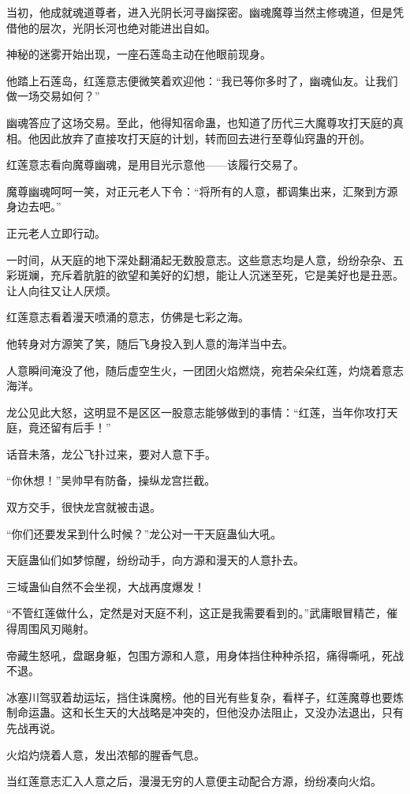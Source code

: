 \begin{this_body}
当初，他成就魂道尊者，进入光阴长河寻幽探密。幽魂魔尊当然主修魂道，但是凭借他的层次，光阴长河也绝对能进出自如。

神秘的迷雾开始出现，一座石莲岛主动在他眼前现身。

他踏上石莲岛，红莲意志便微笑着欢迎他：“我已等你多时了，幽魂仙友。让我们做一场交易如何？”

幽魂答应了这场交易。至此，他得知宿命蛊，也知道了历代三大魔尊攻打天庭的真相。他因此放弃了直接攻打天庭的计划，转而回去进行至尊仙窍蛊的开创。

红莲意志看向魔尊幽魂，是用目光示意他——该履行交易了。

魔尊幽魂呵呵一笑，对正元老人下令：“将所有的人意，都调集出来，汇聚到方源身边去吧。”

正元老人立即行动。

一时间，从天庭的地下深处翻涌起无数股意志。这些意志均是人意，纷纷杂杂、五彩斑斓，充斥着肮脏的欲望和美好的幻想，能让人沉迷至死，它是美好也是丑恶。让人向往又让人厌烦。

红莲意志看着漫天喷涌的意志，仿佛是七彩之海。

他转身对方源笑了笑，随后飞身投入到人意的海洋当中去。

人意瞬间淹没了他，随后虚空生火，一团团火焰燃烧，宛若朵朵红莲，灼烧着意志海洋。

龙公见此大怒，这明显不是区区一股意志能够做到的事情：“红莲，当年你攻打天庭，竟还留有后手！”

话音未落，龙公飞扑过来，要对人意下手。

“你休想！”吴帅早有防备，操纵龙宫拦截。

双方交手，很快龙宫就被击退。

“你们还要发呆到什么时候？”龙公对一干天庭蛊仙大吼。

天庭蛊仙们如梦惊醒，纷纷动手，向方源和漫天的人意扑去。

三域蛊仙自然不会坐视，大战再度爆发！

“不管红莲做什么，定然是对天庭不利，这正是我需要看到的。”武庸眼冒精芒，催得周围风刃飚射。

帝藏生怒吼，盘踞身躯，包围方源和人意，用身体挡住种种杀招，痛得嘶吼，死战不退。

冰塞川驾驭着劫运坛，挡住诛魔榜。他的目光有些复杂，看样子，红莲魔尊也要炼制命运蛊。这和长生天的大战略是冲突的，但他没办法阻止，又没办法退出，只有先战再说。

火焰灼烧着人意，发出浓郁的腥香气息。

当红莲意志汇入人意之后，漫漫无穷的人意便主动配合方源，纷纷凑向火焰。


\end{this_body}
